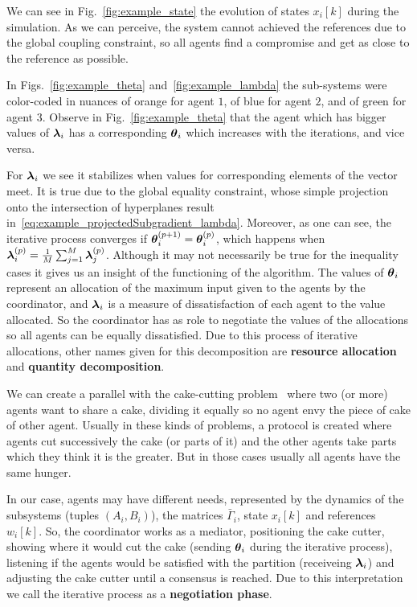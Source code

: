 \documentclass[../main.tex]{subfiles}
\begin{document}
We can see in Fig.~\ref{fig:example_state} the evolution of states $x_{i}[k]$ during the simulation.
As we can perceive, the system cannot achieved the references due to the global coupling constraint, so all agents find a compromise and get as close to the reference as possible.

In Figs.~\ref{fig:example_theta} and~\ref{fig:example_lambda} the sub-systems were color-coded in nuances of orange for agent $1$, of blue for agent $2$, and of green for agent $3$.
Observe in Fig.~\ref{fig:example_theta} that the agent which has bigger values of $\boldsymbol{\lambda}_i$ has a corresponding $\boldsymbol{\theta}_i$ which increases with the iterations, and vice versa.

For $\boldsymbol{\lambda}_i$ we see it stabilizes when values for corresponding elements of the vector meet.
It is true due to the global equality constraint, whose simple projection onto the intersection of hyperplanes result in~\eqref{eq:example_projectedSubgradient_lambda}.
Moreover, as one can see, the iterative process converges if ${\boldsymbol{\theta}_i^{(p+1)}=\boldsymbol{\theta}_i^{(p)}}$, which happens when ${\boldsymbol{\lambda}_i^{(p)}=\frac{1}{M}\sum_{j=1}^{M}\boldsymbol{\lambda}_j^{(p)}}$.
Although it may not necessarily be true for the inequality cases it gives us an insight of the functioning of the algorithm.
The values of $\boldsymbol{\theta}_i$ represent an allocation of the maximum input given to the agents by the coordinator, and $\boldsymbol{\lambda}_i$ is a measure of dissatisfaction of each agent to the value allocated.
So the coordinator has as role to negotiate the values of the allocations so all agents can be equally dissatisfied.
Due to this process of iterative allocations, other names given for this decomposition are \textbf{resource allocation} and \textbf{quantity decomposition}.

We can create a parallel with the cake-cutting problem~\cite{BramsTaylor1995} where two (or more) agents want to share a cake, dividing it equally so no agent envy the piece of cake of other agent.
Usually in these kinds of problems, a protocol is created where agents cut successively the cake (or parts of it) and the other agents take parts which they think it is the greater.
But in those cases usually all agents have the same hunger.

In our case, agents may have different needs, represented by the dynamics of the subsystems (tuples $(A_{i},B_{i})$), the matrices $\bar{\Gamma}_{i}$, state $x_{i}[k]$ and references $w_{i}[k]$.
So, the coordinator works as a mediator, positioning the cake cutter, showing where it would cut the cake (sending $\boldsymbol{\theta}_i$ during the iterative process), listening if the agents would be satisfied with the partition (receiveing $\boldsymbol{\lambda}_i$) and adjusting the cake cutter until a consensus is reached.
Due to this interpretation we call the iterative process as a \textbf{negotiation phase}.
\end{document}
